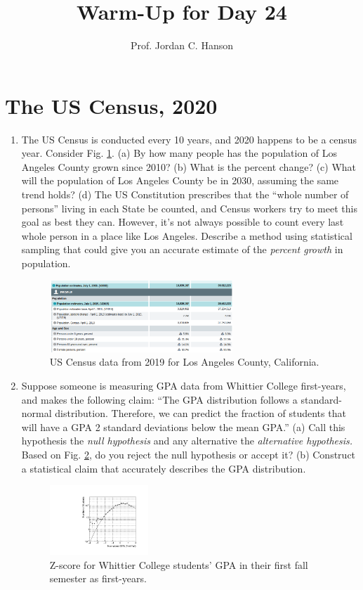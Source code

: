 \documentclass{article}
\begin{document}
\title{Warm-Up for Day 24}
\author{Prof. Jordan C. Hanson}

\maketitle

\section{The US Census, 2020}

\begin{enumerate}
\item The US Census is conducted every 10 years, and 2020 happens to be a census year.  Consider Fig. \ref{fig:population}.  (a) By how many people has the population of Los Angeles County grown since 2010?  (b) What is the percent change?  (c) What will the population of Los Angeles County be in 2030, assuming the same trend holds?  (d) The US Constitution prescribes that the ``whole number of persons'' living in each State be counted, and Census workers try to meet this goal as best they can.  However, it's not always possible to count every last whole person in a place like Los Angeles.  Describe a method using statistical sampling that could give you an accurate estimate of the \textit{percent growth} in population.
\begin{figure}[ht]
\centering
\includegraphics[width=0.65\textwidth]{population.png}
\caption{\label{fig:population} US Census data from 2019 for Los Angeles County, California.}
\end{figure}
\item Suppose someone is measuring GPA data from Whittier College first-years, and makes the following claim: ``The GPA distribution follows a standard-normal distribution.  Therefore, we can predict the fraction of students that will have a GPA 2 standard deviations below the mean GPA.''  (a) Call this hypothesis the \textit{null hypothesis} and any alternative the \textit{alternative hypothesis.}  Based on Fig. \ref{fig:gpa}, do you reject the null hypothesis or accept it?  (b) Construct a statistical claim that accurately describes the GPA distribution.
\begin{figure}[hb]
\centering
\includegraphics[width=0.35\textwidth]{Nov15_plot3.pdf}
\caption{\label{fig:gpa} Z-score for Whittier College students' GPA in their first fall semester as first-years.}
\end{figure}
\end{enumerate}
\end{document}
